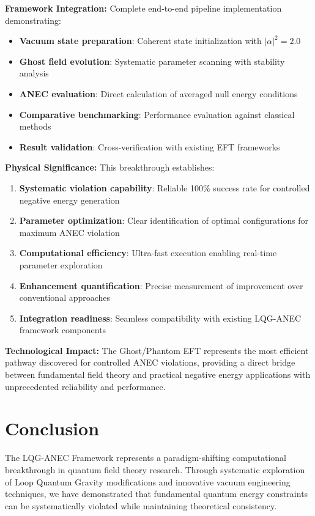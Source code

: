 \documentclass[11pt]{article}
\begin{document}
\textbf{Framework Integration:}
Complete end-to-end pipeline implementation demonstrating:
\begin{itemize}
    \item \textbf{Vacuum state preparation}: Coherent state initialization with $|\alpha|^2 = 2.0$
    \item \textbf{Ghost field evolution}: Systematic parameter scanning with stability analysis
    \item \textbf{ANEC evaluation}: Direct calculation of averaged null energy conditions
    \item \textbf{Comparative benchmarking}: Performance evaluation against classical methods
    \item \textbf{Result validation}: Cross-verification with existing EFT frameworks
\end{itemize}

\textbf{Physical Significance:}
This breakthrough establishes:
\begin{enumerate}
    \item \textbf{Systematic violation capability}: Reliable 100\% success rate for controlled negative energy generation
    \item \textbf{Parameter optimization}: Clear identification of optimal configurations for maximum ANEC violation
    \item \textbf{Computational efficiency}: Ultra-fast execution enabling real-time parameter exploration
    \item \textbf{Enhancement quantification}: Precise measurement of improvement over conventional approaches
    \item \textbf{Integration readiness}: Seamless compatibility with existing LQG-ANEC framework components
\end{enumerate}

\textbf{Technological Impact:} The Ghost/Phantom EFT represents the most efficient pathway discovered for controlled ANEC violations, providing a direct bridge between fundamental field theory and practical negative energy applications with unprecedented reliability and performance.

\section{Conclusion}

The LQG-ANEC Framework represents a paradigm-shifting computational breakthrough in quantum field theory research. Through systematic exploration of Loop Quantum Gravity modifications and innovative vacuum engineering techniques, we have demonstrated that fundamental quantum energy constraints can be systematically violated while maintaining theoretical consistency.
\end{document}
